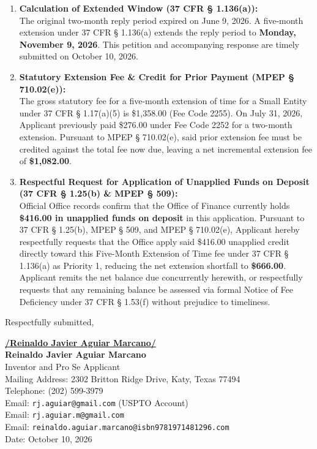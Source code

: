 \documentclass[11pt,letterpaper]{article}
\begin{document}
\begin{enumerate}[leftmargin=*]
    \item \textbf{Calculation of Extended Window (37 CFR \S{} 1.136(a)):} \\
    The original two-month reply period expired on June 9, 2026. A five-month extension under 37 CFR \S{} 1.136(a) extends the reply period to \textbf{Monday, November 9, 2026}. This petition and accompanying response are timely submitted on October 10, 2026.

    \item \textbf{Statutory Extension Fee \& Credit for Prior Payment (MPEP \S{} 710.02(e)):} \\
    The gross statutory fee for a five-month extension of time for a Small Entity under 37 CFR \S{} 1.17(a)(5) is \$1,358.00 (Fee Code 2255). On July 31, 2026, Applicant previously paid \$276.00 under Fee Code 2252 for a two-month extension. Pursuant to MPEP \S{} 710.02(e), said prior extension fee must be credited against the total fee now due, leaving a net incremental extension fee of \textbf{\$1,082.00}.

    \item \textbf{Respectful Request for Application of Unapplied Funds on Deposit (37 CFR \S{} 1.25(b) \& MPEP \S{} 509):} \\
    Official Office records confirm that the Office of Finance currently holds \textbf{\$416.00 in unapplied funds on deposit} in this application. Pursuant to 37 CFR \S{} 1.25(b), MPEP \S{} 509, and MPEP \S{} 710.02(e), Applicant hereby respectfully requests that the Office apply said \$416.00 unapplied credit directly toward this Five-Month Extension of Time fee under 37 CFR \S{} 1.136(a) as Priority 1, reducing the net extension shortfall to \textbf{\$666.00}. Applicant remits the net balance due concurrently herewith, or respectfully requests that any remaining balance be assessed via formal Notice of Fee Deficiency under 37 CFR \S{} 1.53(f) without prejudice to timeliness.
\end{enumerate}

\vspace{0.6cm}
\begin{singlespace}
\noindent Respectfully submitted, \par\vspace{0.8cm}
\underline{\textbf{/Reinaldo Javier Aguiar Marcano/}} \\
\textbf{Reinaldo Javier Aguiar Marcano} \\
Inventor and Pro Se Applicant \\
Mailing Address: 2302 Britton Ridge Drive, Katy, Texas 77494 \\
Telephone: (202) 599-3979 \\
Email: \texttt{rj.aguiar@gmail.com} (USPTO Account) \\
Email: \texttt{rj.aguiar.m@gmail.com} \\
Email: \texttt{reinaldo.aguiar.marcano@isbn9781971481296.com} \\
Date: October 10, 2026
\end{singlespace}
\end{document}
